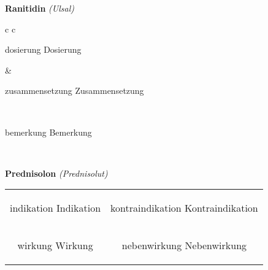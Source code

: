 \documentclass[12pt]{beamer}
\begin{document}
\begin{frame}{
    \textbf{Ranitidin}
    \textit{(Ulsal)}
}
    \begin{tabular}{c c}
        \begin{beamercolorbox}[wd=\boxwidth\textwidth,ht=\boxheight\textheight,sep=1em]{dosierung}
        Dosierung
        \end{beamercolorbox} & 
        \begin{beamercolorbox}[wd=\boxwidth\textwidth,ht=\boxheight\textheight,sep=1em]{zusammensetzung}
        Zusammensetzung
        \end{beamercolorbox} \\
        \begin{beamercolorbox}[wd=\textwidth,ht=\boxheight\textheight,sep=1em]{bemerkung}
        Bemerkung
        \end{beamercolorbox} \\
    \end{tabular}
\end{frame}
\begin{frame}{
    \textbf{Prednisolon}
    \textit{(Prednisolut)}
}
    \begin{tabular}{c c}
        \begin{beamercolorbox}[wd=\boxwidth\textwidth,ht=\boxheight\textheight,sep=1em]{indikation}
        Indikation
        \end{beamercolorbox} & 
        \begin{beamercolorbox}[wd=\boxwidth\textwidth,ht=\boxheight\textheight,sep=1em]{kontraindikation}
        Kontraindikation 
        \end{beamercolorbox} \\
        \begin{beamercolorbox}[wd=\boxwidth\textwidth,ht=\boxheight\textheight,sep=1em]{wirkung}
        Wirkung
        \end{beamercolorbox} & 
        \begin{beamercolorbox}[wd=\boxwidth\textwidth,ht=\boxheight\textheight,sep=1em]{nebenwirkung}
        Nebenwirkung
        \end{beamercolorbox} \\
    \end{tabular}
\end{frame}
\end{document}
